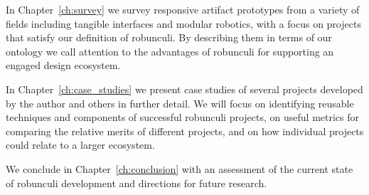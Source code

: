 In Chapter~\ref{ch:survey} we survey responsive artifact prototypes from a variety of fields including tangible interfaces and modular robotics, with a focus on projects that satisfy our definition of robunculi. 
By describing them in terms of our ontology we call attention to the advantages of robunculi for supporting an engaged design ecosystem. 

In Chapter~\ref{ch:case_studies} we present case studies of several projects developed by the author and others in further detail.
We will focus on identifying reusable techniques and components of successful robunculi projects, on useful metrics for comparing the relative merits of different projects, and on how individual projects could relate to a larger ecosystem. 

We conclude in Chapter~\ref{ch:conclusion} with an assessment of the current state of robunculi development and directions for future research.




